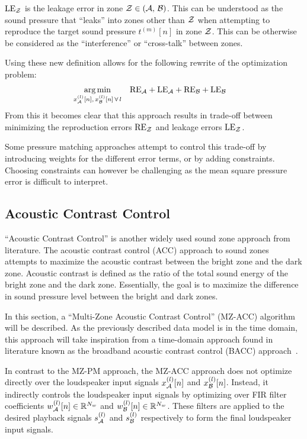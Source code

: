 $\text{LE}_{\mathcal{Z}}$ is the leakage error in zone $\mathcal{Z} \in \left(\mathcal{A},\,\mathcal{B}\right)$.
This can be understood as the sound pressure that ``leaks'' into zones other than $\mathcal{Z}$ when attempting to reproduce the target sound pressure $t^{(m)}[n]$ in 
zone $\mathcal{Z}$. 
This can be otherwise be considered as the ``interference'' or ``cross-talk'' between zones.

Using these new definition allows for the following rewrite of the optimization problem:
\begin{align}
    \argmin{x_\za^{(l)}[n],\,x_\zb^{(l)}[n]\,\forall\,l}{
       &\text{RE}_\za + \text{LE}_\za + \text{RE}_\zb + \text{LE}_\zb
    }
\end{align}
From this it becomes clear that this approach results in trade-off between minimizing the reproduction errors $\text{RE}_{\mathcal{Z}}$ 
and leakage errors $\text{LE}_{\mathcal{Z}}$. 

Some pressure matching approaches attempt to control this trade-off by introducing weights for the different error terms, 
or by adding constraints.
Choosing constraints can however be challenging as the mean square pressure error is difficult to interpret.

\subsection{Acoustic Contrast Control}
\label{ch:sound_zone:approaches:acoustic_contrast_control}
``Acoustic Contrast Control'' is another widely used sound zone approach from literature.
The acoustic contrast control (ACC) approach to sound zones attempts to maximize the acoustic contrast between the bright zone and the dark zone. 
Acoustic contrast is defined as the ratio of the total sound energy of the bright zone and the dark zone.
Essentially, the goal is to maximize the difference in sound pressure level between the bright and dark zones.

In this section, a ``Multi-Zone Acoustic Contrast Control'' (MZ-ACC) algorithm will be described.
As the previously described data model is in the time domain, this approach will take inspiration from a time-domain approach found in literature known as the
broadband acoustic contrast control (BACC) approach~\cite{elliott2011regularisation, cai2014time, moller2016sound}.

In contrast to the MZ-PM approach, the MZ-ACC approach does not optimize directly over the loudspeaker input signals $x_{\mathcal{A}}^{(l)}[n]$ and $x_{\mathcal{B}}^{(l)}[n]$.
Instead, it indirectly controls the loudspeaker input signals by optimizing over 
FIR filter coefficients $w_{\mathcal{A}}^{(l)}[n]\in\mathbb{R}^{N_w}$ and $w_{\mathcal{B}}^{(l)}[n]\in\mathbb{R}^{N_w}$.
These filters are applied to the desired playback signals $s_{\mathcal{A}}^{(l)}$ and $s_{\mathcal{B}}^{(l)}$ respectively to form the final loudspeaker input signals.

